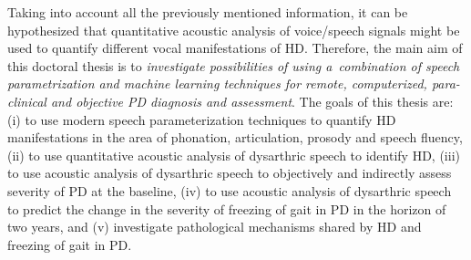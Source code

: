 Taking into account all the previously mentioned information, it can be hypothesized that quantitative acoustic analysis of voice/speech signals might be used to quantify different vocal manifestations of HD. Therefore, the main aim of this doctoral thesis is to \textit{investigate possibilities of using a~combination of speech parametrization and machine learning techniques for remote, computerized, para-clinical and objective PD diagnosis and assessment}. The goals of this thesis are: (i) to use modern speech parameterization techniques to quantify HD manifestations in the area of phonation, articulation, prosody and speech fluency, (ii) to use quantitative acoustic analysis of dysarthric speech to identify HD, (iii) to use acoustic analysis of dysarthric speech to objectively and indirectly assess severity of PD at the baseline, (iv) to use acoustic analysis of dysarthric speech to predict the change in the severity of freezing of gait in PD in the horizon of two years, and (v) investigate pathological mechanisms shared by HD and freezing of gait in PD.

